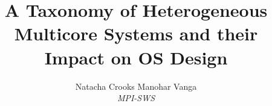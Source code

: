 

\newif \ifDraft\Drafttrue

\ifDraft
  \newcommand{\Comment}[1]{\textbf{\textsl{#1}}}
\else
  \newcommand{\Comment}[1]{\relax}
\fi

\newcommand{\gernot}[1]{\Comment{#1 [gernot]}}


\title{\textbf{
A Taxonomy of Heterogeneous Multicore Systems and their Impact on OS Design}
}

\author{
Natacha Crooks \quad
Manohar Vanga
\\ \emph{MPI-SWS}
}
\date{\vspace{-8pt}}




\maketitle



%

%
%



%
\small
\selectfont


\normalsize

